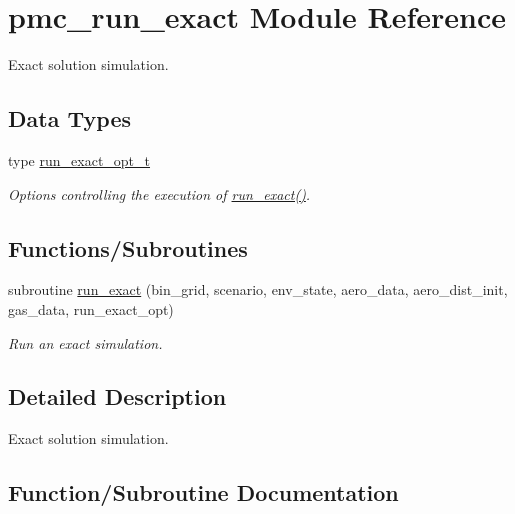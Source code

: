 \hypertarget{namespacepmc__run__exact}{}\section{pmc\+\_\+run\+\_\+exact Module Reference}
\label{namespacepmc__run__exact}


Exact solution simulation.  


\subsection*{Data Types}
\begin{DoxyCompactItemize}
\item 
type \mbox{\hyperlink{structpmc__run__exact_1_1run__exact__opt__t}{run\+\_\+exact\+\_\+opt\+\_\+t}}
\begin{DoxyCompactList}\small\item\em Options controlling the execution of \mbox{\hyperlink{namespacepmc__run__exact_a8db86b29e1aee6d3aa9f2e922dd1eb97}{run\+\_\+exact()}}. \end{DoxyCompactList}\end{DoxyCompactItemize}
\subsection*{Functions/\+Subroutines}
\begin{DoxyCompactItemize}
\item 
subroutine \mbox{\hyperlink{namespacepmc__run__exact_a8db86b29e1aee6d3aa9f2e922dd1eb97}{run\+\_\+exact}} (bin\+\_\+grid, scenario, env\+\_\+state, aero\+\_\+data, aero\+\_\+dist\+\_\+init, gas\+\_\+data, run\+\_\+exact\+\_\+opt)
\begin{DoxyCompactList}\small\item\em Run an exact simulation. \end{DoxyCompactList}\end{DoxyCompactItemize}


\subsection{Detailed Description}
Exact solution simulation. 

\subsection{Function/\+Subroutine Documentation}
\mbox{\label{namespacepmc__run__exact_a8db86b29e1aee6d3aa9f2e922dd1eb97}} 
